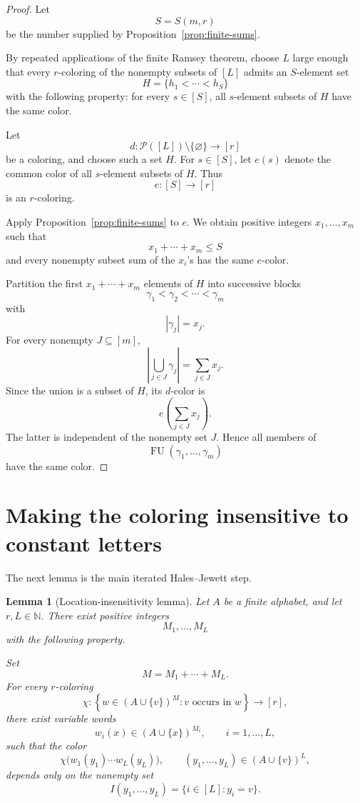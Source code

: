 \documentclass[11pt]{article}
\newtheorem{lemma}[theorem]{Lemma}
\newcommand{\N}{\mathbb N}
\newcommand{\Pow}{\mathcal P}
\newcommand{\FU}{\operatorname{FU}}
\begin{document}
\begin{proof}
  Let
  \[
    S=S(m,r)
  \]
  be the number supplied by Proposition~\ref{prop:finite-sums}.

  By repeated applications of the finite Ramsey theorem, choose \(L\)
  large enough that every \(r\)-coloring of the nonempty subsets of
  \([L]\) admits an \(S\)-element set
  \[
    H=\{h_1<\cdots<h_S\}
  \]
  with the following property: for every \(s\in[S]\), all \(s\)-element
  subsets of \(H\) have the same color.

  Let
  \[
    d:\Pow([L])\setminus\{\varnothing\}\longrightarrow[r]
  \]
  be a coloring, and choose such a set \(H\). For \(s\in[S]\), let
  \(e(s)\) denote the common color of all \(s\)-element subsets of \(H\).
  Thus
  \[
    e:[S]\longrightarrow[r]
  \]
  is an \(r\)-coloring.

  Apply Proposition~\ref{prop:finite-sums} to \(e\). We obtain positive
  integers \(x_1,\dots,x_m\) such that
  \[
    x_1+\cdots+x_m\leq S
  \]
  and every nonempty subset sum of the \(x_i\)'s has the same \(e\)-color.

  Partition the first \(x_1+\cdots+x_m\) elements of \(H\) into
  successive blocks
  \[
    \gamma_1<\gamma_2<\cdots<\gamma_m
  \]
  with
  \[
    |\gamma_j|=x_j.
  \]
  For every nonempty \(J\subseteq[m]\),
  \[
    \left|\bigcup_{j\in J}\gamma_j\right|
    =
    \sum_{j\in J}x_j.
  \]
  Since the union is a subset of \(H\), its \(d\)-color is
  \[
    e\left(\sum_{j\in J}x_j\right).
  \]
  The latter is independent of the nonempty set \(J\). Hence all
  members of
  \[
    \FU(\gamma_1,\dots,\gamma_m)
  \]
  have the same color.
\end{proof}

\section{Making the coloring insensitive to constant letters}

The next lemma is the main iterated Hales--Jewett step.

\begin{lemma}[Location-insensitivity lemma]
  \label{lem:location-insensitivity}
  Let \(A\) be a finite alphabet, and let \(r,L\in\N\). There exist
  positive integers
  \[
    M_1,\dots,M_L
  \]
  with the following property.

  Set
  \[
    M=M_1+\cdots+M_L.
  \]
  For every \(r\)-coloring
  \[
    \chi:
    \left\{
      w\in(A\cup\{v\})^M:
      v\text{ occurs in }w
    \right\}
    \longrightarrow[r],
  \]
  there exist variable words
  \[
    w_i(x)\in(A\cup\{x\})^{M_i},
    \qquad i=1,\dots,L,
  \]
  such that the color
  \[
    \chi\bigl(w_1(y_1)\cdots w_L(y_L)\bigr),
    \qquad
    (y_1,\dots,y_L)\in(A\cup\{v\})^L,
  \]
  depends only on the nonempty set
  \[
    I(y_1,\dots,y_L)
    =
    \{i\in[L]:y_i=v\}.
  \]
\end{lemma}
\end{document}
